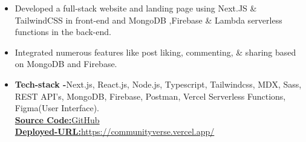 \documentclass[10pt,a4paper,ragged2e]{altacv}
\begin{document}

\begin{fullwidth}
\makecvheader
\end{fullwidth}



{}
\begin{itemize}
\item Developed a full-stack website and landing page using Next.JS \& TailwindCSS in front-end and MongoDB ,Firebase \& Lambda serverless functions in the back-end.
\item Integrated numerous features like post liking, commenting, \& sharing based on MongoDB and Firebase.
\item \textbf{Tech-stack -}Next.js, React.js, Node.js, Typescript, Tailwindcss, MDX, Sass, REST API's, MongoDB, Firebase, Postman, Vercel Serverless Functions, Figma(User Interface).
\\
 \href{https://github.com/ghulamyazdani/CommunityVerse}{\textbf{Source Code:}GitHub}
 \\
 \href{https://communityverse.vercel.app/}{\textbf{Deployed-URL:}https://communityverse.vercel.app/}

\end{itemize}
\smallskip
\end{document}
